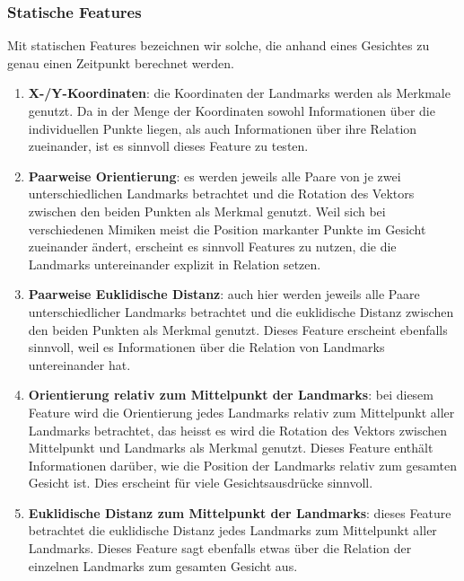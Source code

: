 \subsubsection{Statische Features}
Mit statischen Features bezeichnen wir solche, die anhand eines Gesichtes zu genau einen Zeitpunkt berechnet werden. 
\begin{enumerate}
  \item \textbf{X-/Y-Koordinaten}: die Koordinaten der Landmarks werden als Merkmale genutzt. Da in der Menge der Koordinaten sowohl Informationen
        über die individuellen Punkte liegen, als auch Informationen über ihre Relation zueinander, ist es sinnvoll dieses Feature zu testen.

  \item \textbf{Paarweise Orientierung}: es werden jeweils alle Paare von je zwei unterschiedlichen Landmarks betrachtet und die Rotation des Vektors zwischen
        den beiden Punkten als Merkmal genutzt. Weil sich bei verschiedenen Mimiken meist die Position markanter Punkte im Gesicht zueinander ändert, erscheint es sinnvoll
        Features zu nutzen, die die Landmarks untereinander explizit in Relation setzen.

  \item \textbf{Paarweise Euklidische Distanz}: auch hier werden jeweils alle Paare unterschiedlicher Landmarks betrachtet und die euklidische Distanz zwischen
        den beiden Punkten als Merkmal genutzt. Dieses Feature erscheint ebenfalls sinnvoll, weil es Informationen über die Relation von Landmarks untereinander hat.

  \item \textbf{Orientierung relativ zum Mittelpunkt der Landmarks}: bei diesem Feature wird die Orientierung jedes Landmarks relativ zum Mittelpunkt aller Landmarks betrachtet,
        das heisst es wird die Rotation des Vektors zwischen Mittelpunkt und Landmarks als Merkmal genutzt. Dieses Feature enthält Informationen darüber, wie die Position der Landmarks relativ
        zum gesamten Gesicht ist. Dies erscheint für viele Gesichtsausdrücke sinnvoll.

  \item \textbf{Euklidische Distanz zum Mittelpunkt der Landmarks}: dieses Feature betrachtet die euklidische Distanz jedes Landmarks zum Mittelpunkt aller Landmarks. Dieses Feature sagt ebenfalls
        etwas über die Relation der einzelnen Landmarks zum gesamten Gesicht aus.


\end{enumerate}
